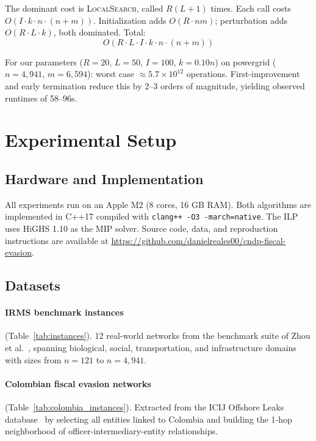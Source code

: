 \documentclass[11pt,a4paper]{article}
\begin{document}
The dominant cost is \textsc{LocalSearch}, called $R(L+1)$ times. Each call costs $O(I \cdot k \cdot n \cdot (n+m))$. Initialization adds $O(R \cdot nm)$; perturbation adds $O(R \cdot L \cdot k)$, both dominated. Total:
\[
O(R \cdot L \cdot I \cdot k \cdot n \cdot (n + m))
\]

For our parameters ($R = 20$, $L = 50$, $I = 100$, $k = 0.10n$) on powergrid ($n = 4{,}941$, $m = 6{,}594$): worst case $\approx 5.7 \times 10^{12}$ operations. First-improvement and early termination reduce this by 2--3 orders of magnitude, yielding observed runtimes of 58--96s.

\section{Experimental Setup}
\label{sec:setup}

\subsection{Hardware and Implementation}
All experiments run on an Apple M2 (8 cores, 16 GB RAM). Both algorithms are implemented in C++17 compiled with \texttt{clang++ -O3 -march=native}. The ILP uses HiGHS 1.10 as the MIP solver. Source code, data, and reproduction instructions are available at \url{https://github.com/danielreales00/cndp-fiscal-evasion}.

\subsection{Datasets}

\paragraph{IRMS benchmark instances} (Table~\ref{tab:instances}). 12 real-world networks from the benchmark suite of Zhou et al.~\cite{zhou2023}, spanning biological, social, transportation, and infrastructure domains with sizes from $n=121$ to $n=4{,}941$.

\paragraph{Colombian fiscal evasion networks} (Table~\ref{tab:colombia_instances}). Extracted from the ICIJ Offshore Leaks database~\cite{icij2021} by selecting all entities linked to Colombia and building the 1-hop neighborhood of officer-intermediary-entity relationships.
\end{document}
